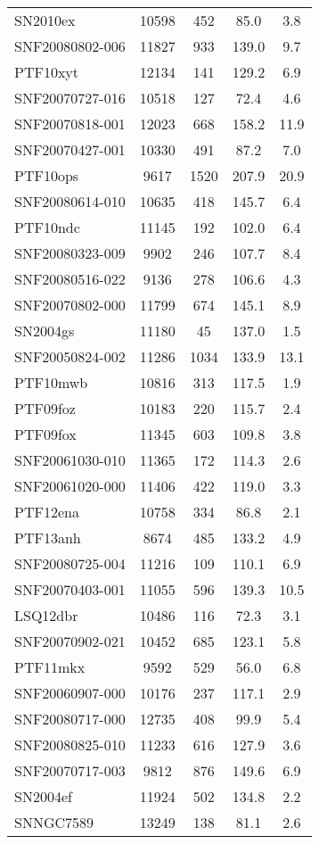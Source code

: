 \begin{longtable}{lcccc}
SN2010ex & 10598 & 452 & 85.0 & 3.8 \\
SNF20080802-006 & 11827 & 933 & 139.0 & 9.7 \\
PTF10xyt & 12134 & 141 & 129.2 & 6.9 \\
SNF20070727-016 & 10518 & 127 & 72.4 & 4.6 \\
SNF20070818-001 & 12023 & 668 & 158.2 & 11.9 \\
SNF20070427-001 & 10330 & 491 & 87.2 & 7.0 \\
PTF10ops & 9617 & 1520 & 207.9 & 20.9 \\
SNF20080614-010 & 10635 & 418 & 145.7 & 6.4 \\
PTF10ndc & 11145 & 192 & 102.0 & 6.4 \\
SNF20080323-009 & 9902 & 246 & 107.7 & 8.4 \\
SNF20080516-022 & 9136 & 278 & 106.6 & 4.3 \\
SNF20070802-000 & 11799 & 674 & 145.1 & 8.9 \\
SN2004gs & 11180 & 45 & 137.0 & 1.5 \\
SNF20050824-002 & 11286 & 1034 & 133.9 & 13.1 \\
PTF10mwb & 10816 & 313 & 117.5 & 1.9 \\
PTF09foz & 10183 & 220 & 115.7 & 2.4 \\
PTF09fox & 11345 & 603 & 109.8 & 3.8 \\
SNF20061030-010 & 11365 & 172 & 114.3 & 2.6 \\
SNF20061020-000 & 11406 & 422 & 119.0 & 3.3 \\
PTF12ena & 10758 & 334 & 86.8 & 2.1 \\
PTF13anh & 8674 & 485 & 133.2 & 4.9 \\
SNF20080725-004 & 11216 & 109 & 110.1 & 6.9 \\
SNF20070403-001 & 11055 & 596 & 139.3 & 10.5 \\
LSQ12dbr & 10486 & 116 & 72.3 & 3.1 \\
SNF20070902-021 & 10452 & 685 & 123.1 & 5.8 \\
PTF11mkx & 9592 & 529 & 56.0 & 6.8 \\
SNF20060907-000 & 10176 & 237 & 117.1 & 2.9 \\
SNF20080717-000 & 12735 & 408 & 99.9 & 5.4 \\
SNF20080825-010 & 11233 & 616 & 127.9 & 3.6 \\
SNF20070717-003 & 9812 & 876 & 149.6 & 6.9 \\
SN2004ef & 11924 & 502 & 134.8 & 2.2 \\
SNNGC7589 & 13249 & 138 & 81.1 & 2.6 \\

\end{longtable}
